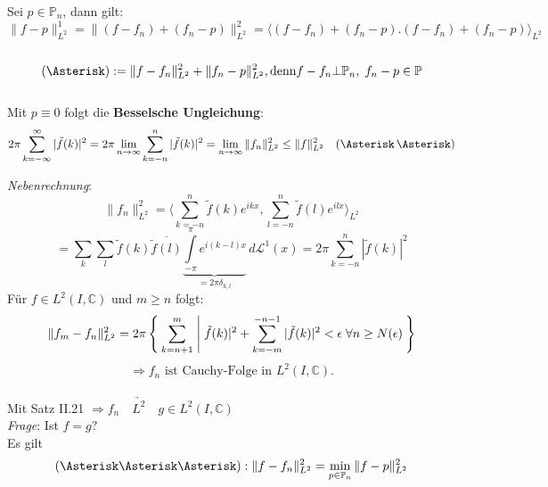 \documentclass[11pt]{memoir}
\begin{document}
Sei $p \in \mathbb P_n$, dann gilt: \\
$$\|f - p \|^1_{L^2} = \|(f-f_n) + (f_n - p)\|^2_{L^2} = \langle(f-f_n) + (f_n - p). (f-f_n) + (f_n - p)\rangle_{L^2}$$ \\
$$(\Asterisk) : = \|f - f_n\|_{L^2}^2 + \|f_n - p\|^2_{L^2}, \text{denn} f-f_n \bot \mathbb P_n, \;f_n - p \in \mathbb P$$ \\
Mit $p \equiv 0$ folgt die \textbf{Besselsche Ungleichung}:
$$2\pi \sum\limits_{k=-\infty}^\infty |\tilde{f}(k)|^2 = 2\pi \lim_{n \rightarrow \infty} \sum\limits_{k=-n}^n |\tilde{f}(k)|^2 = \lim_{n \rightarrow \infty} \|f_n\|_{L^2}^2 \leq \|f\|_{L^2}^2 \quad (\Asterisk \, \Asterisk)$$

\emph{Nebenrechnung}: \\
$$\|f_n\|_{L^2}^2 = \langle\sum\limits_{k=-n}^n \tilde{f}(k) e^{ikx}, \sum\limits_{l=-n}^n \tilde{f}(l) e^{ilx} \rangle_{L^2} $$
$$ = \sum_k \sum_l \tilde{f}(k)\overline{\tilde{f}(l)} \underbrace{\int\limits_{-\pi}^\pi e^{i(k-l)x}}_{= 2\pi \delta_{k,l}} \, d\mathscr L^1(x) = 2\pi \sum\limits_{k=-n}^n |\tilde{f}(k)|^2$$ 
Für $f \in L^2(I, \mathbb C)$ und $m \geq n$ folgt: \\
$$\|f_m - f_n\|_{L^2}^2 = 2\pi \Set{\sum\limits_{k=n+1}^m |\tilde{f}(k)|^2  + \sum\limits_{k=-m}^{-n-1}|\tilde{f}(k)|^2 < \epsilon \; \forall n \geq N(\epsilon) }$$ 
$$\Rightarrow f_n \text{ ist Cauchy-Folge in }L^2(I, \mathbb C).$$ \\
Mit Satz II.21 $\Rightarrow f_n \quad \underrightarrow{L^2}\quad  g\in L^2(I, \mathbb C)$ \\

\emph{Frage}: Ist $f = g$? \\
Es gilt $$(\Asterisk \Asterisk \Asterisk): \|f-f_n\|_{L^2}^2 = \min_{p \in \mathbb P_n} \|f-p\|_{L^2}^2$$  
\end{document}
